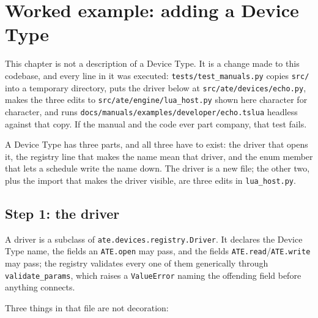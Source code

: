\chapter{Worked example: adding a Device Type}\label{ch:device-type}

This chapter is not a description of a Device Type. It is a change made to this codebase, and every
line in it was executed: \texttt{tests/\allowbreak{}test\_\allowbreak{}manuals.py} copies \texttt{src/} into a temporary
directory, puts the driver below at \texttt{src/\allowbreak{}ate/\allowbreak{}devices/\allowbreak{}echo.py}, makes the three edits
to \texttt{src/\allowbreak{}ate/\allowbreak{}engine/\allowbreak{}lua\_\allowbreak{}host.py} shown here character for character, and runs
\texttt{docs/\allowbreak{}manuals/\allowbreak{}examples/\allowbreak{}developer/\allowbreak{}echo.tslua} headless against that copy. If the
manual and the code ever part company, that test fails.

A Device Type has three parts, and all three have to exist: the driver that opens it, the registry
line that makes the name mean that driver, and the enum member that lets a schedule write the name
down. The driver is a new file; the other two, plus the import that makes the driver visible, are
three edits in \texttt{lua\_\allowbreak{}host.py}.

\section{Step 1: the driver}

A driver is a subclass of \texttt{ate.devices.registry.Driver}. It declares the Device Type name,
the fields an \texttt{ATE.open} may pass, and the fields \texttt{ATE.read}/\texttt{ATE.write} may
pass; the registry validates every one of them generically through \texttt{validate\_params}, which
raises a \texttt{ValueError} naming the offending field before anything connects.



Three things in that file are not decoration:

